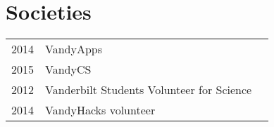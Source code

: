 \documentclass[letterpaper]{deedy-resume} %
\begin{document}
\begin{minipage}[t]{0.66\textwidth}

\section{Societies} 

\begin{tabular}{rll}
2014 & VandyApps\\
2015 & VandyCS\\
2012 & Vanderbilt Students Volunteer for Science\\
2014 & VandyHacks volunteer\\
\end{tabular}

\sectionspace %


\end{minipage} %
\end{document}
